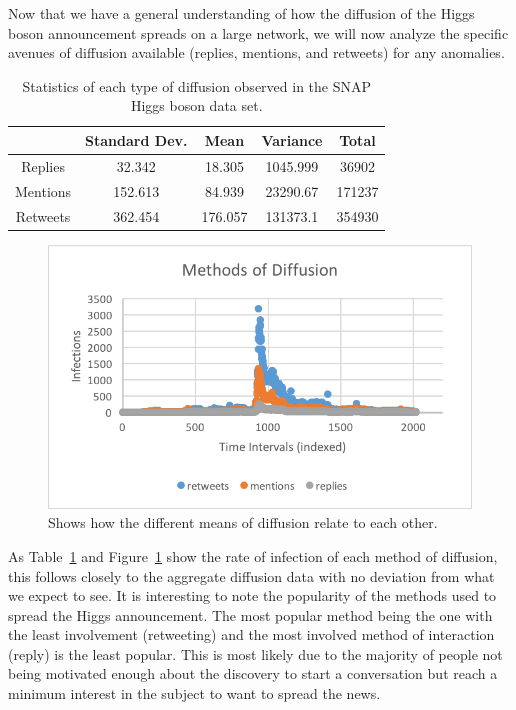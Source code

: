 \documentclass[12pt, oneside, openany]{article} %
\begin{document}
Now that we have a general understanding of how the diffusion of the Higgs boson announcement spreads on a large network, we will now analyze the specific avenues of diffusion available (replies, mentions, and retweets) for any anomalies.

\begin{table}
\centering
\begin{tabular}{| c || c | c | c | c |}
	\hline
   		& Standard Dev. & Mean & Variance &Total \\
   	\hline\hline
  	Replies & 32.342 & 18.305 & 1045.999 & 36902 \\
  	\hline
  	Mentions & 152.613 & 84.939 & 23290.67 & 171237 \\
  	\hline
  	Retweets & 362.454 & 176.057 & 131373.1 & 354930 \\
	\hline
\end{tabular}
  \caption{Statistics of each type of diffusion observed in the SNAP Higgs boson data set.}
  \label{tbl:type-stats}
\end{table}

\begin{figure}
\centering
    \includegraphics{methods.png}
    \caption{Shows how the different means of diffusion relate to each other.}
    \label{fig:methods}
\end{figure}

As Table~\ref{tbl:type-stats} and Figure~\ref{fig:methods} show the rate of infection of each method of diffusion, this follows closely to the aggregate diffusion data with no deviation from what we expect to see. It is interesting to note the popularity of the methods used to spread the Higgs announcement. The most popular method being the one with the least involvement (retweeting) and the most involved method of interaction (reply) is the least popular. This is most likely due to the majority of people not being motivated enough about the discovery to start a conversation but reach a minimum interest in the subject to want to spread the news.
\end{document}
